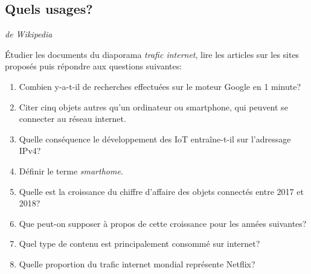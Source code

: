 \documentclass[a4paper,11pt]{article}
\begin{document}
\begin{Form}
\subsection{Quels usages?}
 \emph{de Wikipedia}
\begin{activite}
Étudier les documents du diaporama \emph{trafic internet}, lire les articles sur les sites proposés puis répondre aux questions suivantes:
\begin{enumerate}
\item Combien y-a-t-il de recherches effectuées sur le moteur Google en 1 minute?
\item Citer cinq objets autres qu'un ordinateur ou smartphone, qui peuvent se connecter au réseau internet.
\item Quelle conséquence le développement des IoT entraîne-t-il sur l'adressage IPv4?
\item Définir le terme \emph{smarthome}.
\item Quelle est la croissance du chiffre d'affaire des objets connectés entre 2017 et 2018?
\item Que peut-on supposer à propos de cette croissance pour les années suivantes?
\item Quel type de contenu est principalement consommé sur internet?
\item Quelle proportion du trafic internet mondial représente Netflix?
\end{enumerate}
\end{activite}
\end{Form}
\end{document}
